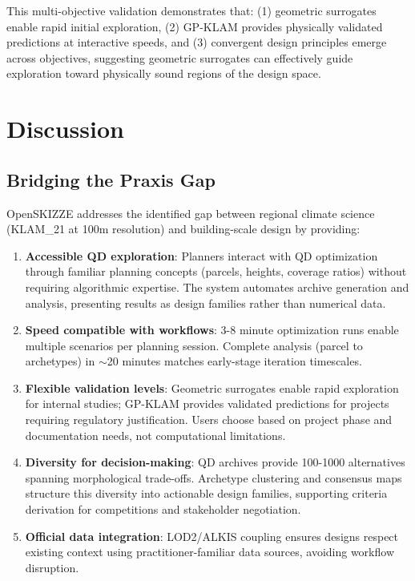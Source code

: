 \documentclass[times,final]{elsarticle}
\begin{document}
This multi-objective validation demonstrates that: (1) geometric surrogates enable rapid initial exploration, (2) GP-KLAM provides physically validated predictions at interactive speeds, and (3) convergent design principles emerge across objectives, suggesting geometric surrogates can effectively guide exploration toward physically sound regions of the design space.

\section{Discussion}

\subsection{Bridging the Praxis Gap}

OpenSKIZZE addresses the identified gap between regional climate science (KLAM\_21 at 100m resolution) and building-scale design by providing:
\begin{enumerate}
\item \textbf{Accessible QD exploration}: Planners interact with QD optimization through familiar planning concepts (parcels, heights, coverage ratios) without requiring algorithmic expertise. The system automates archive generation and analysis, presenting results as design families rather than numerical data.

\item \textbf{Speed compatible with workflows}: 3-8 minute optimization runs enable multiple scenarios per planning session. Complete analysis (parcel to archetypes) in $\sim$20 minutes matches early-stage iteration timescales.

\item \textbf{Flexible validation levels}: Geometric surrogates enable rapid exploration for internal studies; GP-KLAM provides validated predictions for projects requiring regulatory justification. Users choose based on project phase and documentation needs, not computational limitations.

\item \textbf{Diversity for decision-making}: QD archives provide 100-1000 alternatives spanning morphological trade-offs. Archetype clustering and consensus maps structure this diversity into actionable design families, supporting criteria derivation for competitions and stakeholder negotiation.

\item \textbf{Official data integration}: LOD2/ALKIS coupling ensures designs respect existing context using practitioner-familiar data sources, avoiding workflow disruption.
\end{enumerate}
\end{document}
